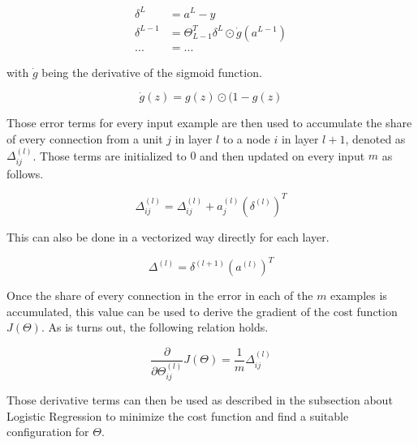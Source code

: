 \begin{equation}
\begin{split}
    \delta^L &= a^L - y \\
    \delta^{L-1} &= \Theta_{L-1}^T\delta^{L} \odot \dot{g}(a^{L-1}) \\
    ... &= ...
\end{split}
\end{equation}

with $\dot{g}$ being the derivative of the sigmoid function.

\begin{equation}
    \dot{g}(z) = g(z)\odot(1-g(z) 
\end{equation}

Those error terms for every input example are then used to accumulate the share of every connection from a unit $j$ in layer $l$ to a node $i$ in layer $l+1$, denoted as $\Delta_{ij}^{(l)}$. Those terms are initialized to $0$ and then updated on every input $m$ as follows.

\begin{equation}
    \Delta_{ij}^{(l)} = \Delta_{ij}^{(l)} + a_j^{(l)}(\delta^{(l)})^T
\end{equation}

This can also be done in a vectorized way directly for each layer.

\begin{equation}
    \Delta^{(l)} = \delta^{(l+1)}(a^{(l)})^T
\end{equation}

Once the share of every connection in the error in each of the $m$ examples is accumulated, this value can be used to derive the gradient of the cost function $J(\Theta)$. As is turns out, the following relation holds.

\begin{equation}
    \frac{\partial}{\partial \Theta_{ij}^{(l)}} J(\Theta) = \frac{1}{m} \Delta_{ij}^{(l)}
\end{equation}

Those derivative terms can then be used as described in the subsection about Logistic Regression  to minimize the cost function and find a suitable configuration for $\Theta$.

